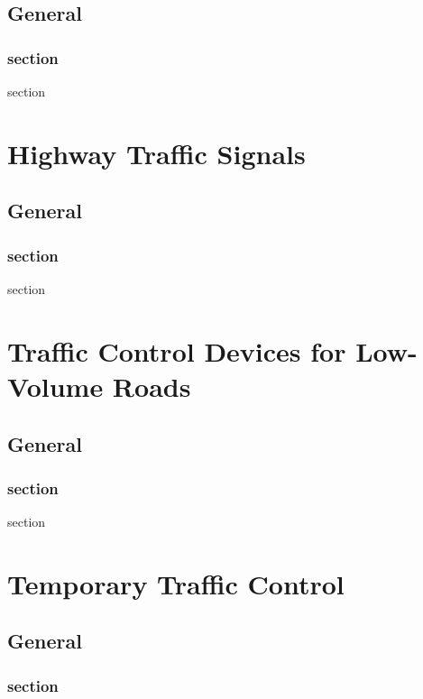 \documentclass[9pt]{memoir}
\newif\ifshowstatus
\newcommand{\status}[1]{\ifshowstatus\section*{Status}\par#1\par\fi}
\begin{document}
\chapter{General}

\section{section}

section

\part{Highway Traffic Signals}

\status{Blank.}

\chapter{General}

\section{section}

section

\part{Traffic Control Devices for Low-Volume Roads}

\status{Blank.}

\chapter{General}

\section{section}

section

\part{Temporary Traffic Control}

\status{Blank.}

\chapter{General}

\section{section}
\end{document}
